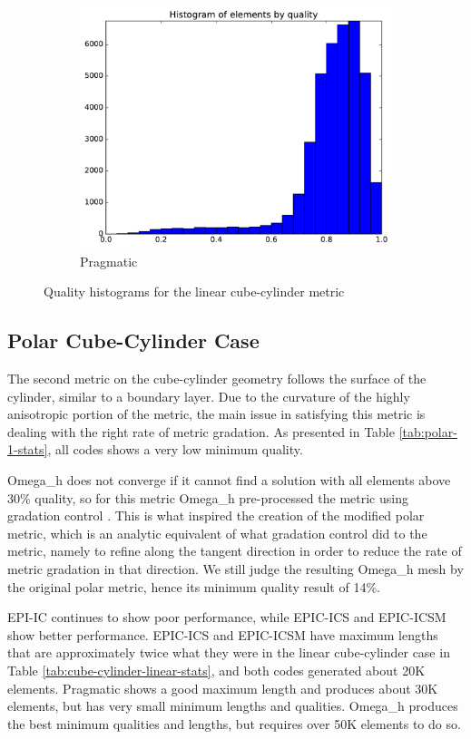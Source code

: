 \documentclass[3p,times,procedia,number]{elsarticle}
\begin{document}
\begin{figure}
\begin{subfigure}{.24\textwidth}
\includegraphics[width=\textwidth]{pragmatic-cube-cylinder-linear-quality.pdf}
\caption{Pragmatic}
\end{subfigure}
\caption{Quality histograms for the linear cube-cylinder metric}
\label{fig:cube-cylinder-linear-qualities}
\end{figure}

\subsection{Polar Cube-Cylinder Case}

The second metric on the cube-cylinder geometry follows the surface
of the cylinder, similar to a boundary layer.
Due to the curvature of the highly anisotropic portion of the metric,
the main issue in satisfying this metric is dealing with the
right rate of metric gradation.
As presented in Table \ref{tab:polar-1-stats}, all codes shows
a very low minimum quality.

Omega\_h does not converge if it cannot find a solution with
all elements above 30\% quality, so for this metric Omega\_h
pre-processed the metric using gradation control \cite{alauzet-fead-2010-size-gradation-aniso}.
This is what inspired the creation of the modified polar metric,
which is an analytic equivalent of what gradation control did
to the metric, namely to refine along the tangent direction
in order to reduce the rate of metric gradation in that direction.
We still judge the resulting Omega\_h mesh by the original polar
metric, hence its minimum quality result of 14\%.

EPI-IC continues to show poor performance, while EPIC-ICS
and EPIC-ICSM show better performance.
EPIC-ICS and EPIC-ICSM have maximum lengths that are approximately
twice what they were in the linear cube-cylinder case in
Table \ref{tab:cube-cylinder-linear-stats}, and both codes
generated about 20K elements.
Pragmatic shows a good maximum length and produces about 30K
elements, but has very small minimum lengths and qualities.
Omega\_h produces the best minimum qualities and lengths,
but requires over 50K elements to do so.
\end{document}

